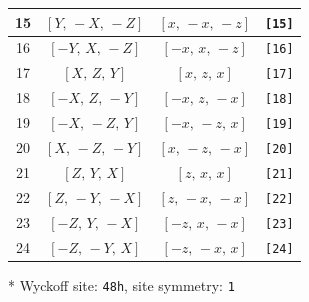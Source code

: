\documentclass[fleqn,8pt]{jsarticle}
\begin{document}
\begin{longtable}{cccc}
15 & $\left[ Y,\, - X,\, - Z \right]$ & $\left[ x,\, - x,\, - z \right]$ & {\tt [15]} \\ \hline
16 & $\left[ - Y,\, X,\, - Z \right]$ & $\left[ - x,\, x,\, - z \right]$ & {\tt [16]} \\ \hline
17 & $\left[ X,\, Z,\, Y \right]$ & $\left[ x,\, z,\, x \right]$ & {\tt [17]} \\ \hline
18 & $\left[ - X,\, Z,\, - Y \right]$ & $\left[ - x,\, z,\, - x \right]$ & {\tt [18]} \\ \hline
19 & $\left[ - X,\, - Z,\, Y \right]$ & $\left[ - x,\, - z,\, x \right]$ & {\tt [19]} \\ \hline
20 & $\left[ X,\, - Z,\, - Y \right]$ & $\left[ x,\, - z,\, - x \right]$ & {\tt [20]} \\ \hline
21 & $\left[ Z,\, Y,\, X \right]$ & $\left[ z,\, x,\, x \right]$ & {\tt [21]} \\ \hline
22 & $\left[ Z,\, - Y,\, - X \right]$ & $\left[ z,\, - x,\, - x \right]$ & {\tt [22]} \\ \hline
23 & $\left[ - Z,\, Y,\, - X \right]$ & $\left[ - z,\, x,\, - x \right]$ & {\tt [23]} \\ \hline
24 & $\left[ - Z,\, - Y,\, X \right]$ & $\left[ - z,\, - x,\, x \right]$ & {\tt [24]} \\
\end{longtable}
* Wyckoff site: {\tt 48h}, site symmetry: {\tt 1}
\renewcommand{\arraystretch}{1.2}
\end{document}
